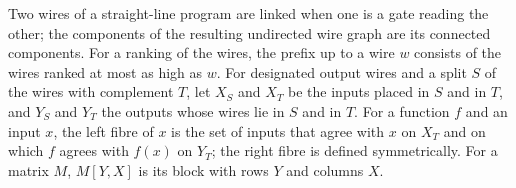 \begin{definition}
  \label{def:lowerbounds-algebraic-multi-output}
  \leanok
  Two wires of a straight-line program are linked when one is a gate reading
  the other; the components of the resulting undirected wire graph are its
  connected components. For a ranking of the wires, the prefix up to a wire
  $w$ consists of the wires ranked at most as high as $w$. For designated
  output wires and a split $S$ of the wires with complement $T$, let $X_S$
  and $X_T$ be the inputs placed in $S$ and in $T$, and $Y_S$ and $Y_T$ the
  outputs whose wires lie in $S$ and in $T$. For a function $f$ and an input
  $x$, the left fibre of $x$ is the set of inputs that agree with $x$ on
  $X_T$ and on which $f$ agrees with $f(x)$ on $Y_T$; the right fibre is
  defined symmetrically. For a matrix $M$, $M[Y, X]$ is its block with rows
  $Y$ and columns $X$.
\end{definition}

